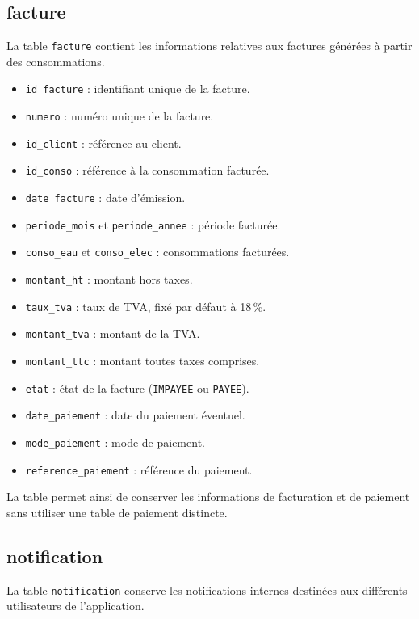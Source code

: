 \subsection{facture}

La table \texttt{facture} contient les informations relatives aux factures générées à partir des consommations.

\begin{itemize}[leftmargin=*]
    \item \texttt{id\_facture} : identifiant unique de la facture.
    \item \texttt{numero} : numéro unique de la facture.
    \item \texttt{id\_client} : référence au client.
    \item \texttt{id\_conso} : référence à la consommation facturée.
    \item \texttt{date\_facture} : date d'émission.
    \item \texttt{periode\_mois} et \texttt{periode\_annee} : période facturée.
    \item \texttt{conso\_eau} et \texttt{conso\_elec} : consommations facturées.
    \item \texttt{montant\_ht} : montant hors taxes.
    \item \texttt{taux\_tva} : taux de TVA, fixé par défaut à 18\,\%.
    \item \texttt{montant\_tva} : montant de la TVA.
    \item \texttt{montant\_ttc} : montant toutes taxes comprises.
    \item \texttt{etat} : état de la facture (\texttt{IMPAYEE} ou \texttt{PAYEE}).
    \item \texttt{date\_paiement} : date du paiement éventuel.
    \item \texttt{mode\_paiement} : mode de paiement.
    \item \texttt{reference\_paiement} : référence du paiement.
\end{itemize}

La table permet ainsi de conserver les informations de facturation et de paiement sans utiliser une table de paiement distincte.

\subsection{notification}

La table \texttt{notification} conserve les notifications internes destinées aux différents utilisateurs de l'application.

